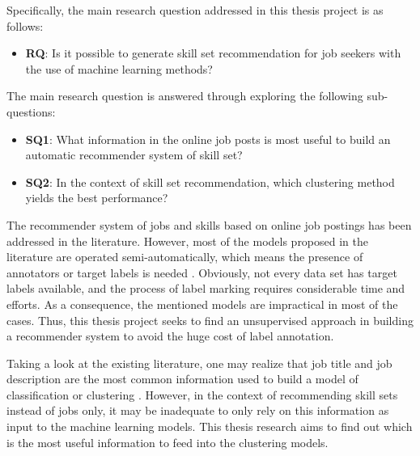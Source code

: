 \documentclass[a4paper,man,floatsintext,natbib,noextraspace]{apa6}
\begin{document}
Specifically, the main research question addressed in this thesis project is as follows: 

\begin{itemize}
    \item \textbf{RQ}: Is it possible to generate skill set recommendation for job seekers with the use of machine learning methods? 
\end{itemize}

The main research question is answered through exploring the following sub-questions:

\begin{itemize}
    \item \textbf{SQ1}: What information in the online job posts is most useful to build an automatic recommender system of skill set?
    \item \textbf{SQ2}: In the context of skill set recommendation, which clustering method yields the best performance?
\end{itemize}

The recommender system of jobs and skills based on online job postings has been addressed in the literature. However, most of the models proposed in the literature are operated semi-automatically, which means the presence of annotators or target labels is needed \citep{calancaResponsibleTeamPlayers2019, daveCombinedRepresentationLearning2018, demauroHumanResourcesBig2018, djumalievaClassifyingOccupationsAccording2018, mhamdiJobRecommendationBased2020}. Obviously, not every data set has target labels available, and the process of label marking requires considerable time and efforts. As a consequence, the mentioned models are impractical in most of the cases. Thus, this thesis project seeks to find an unsupervised approach in building a recommender system to avoid the huge cost of label annotation.

Taking a look at the existing literature, one may realize that job title and job description are the most common information used to build a model of classification \citep{boselliClassifyingOnlineJob2018} or clustering \citep{djumalievaClassifyingOccupationsAccording2018, mhamdiJobRecommendationBased2020}. However, in the context of recommending skill sets instead of jobs only, it may be inadequate to only rely on this information as input to the machine learning models. This thesis research aims to find out which is the most useful information to feed into the clustering models.
\end{document}
